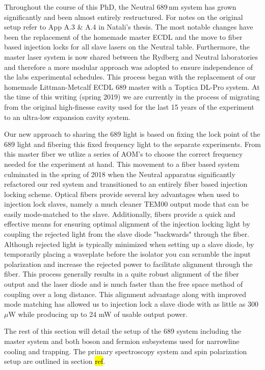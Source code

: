 Throughout the course of this PhD, the Neutral 689\,nm system has grown significantly and been almost entirely restructured. 
For notes on the original setup refer to App A.3 \& A.4 in Natali's thesis.
The most notable changes have been the replacement of the homemade master ECDL and the move to fiber based injection locks for all slave lasers on the Neutral table.
Furthermore, the master laser system is now shared between the Rydberg and Neutral laboratories and therefore a more modular approach was adopted to ensure independence of the labs experimental schedules. 
This process began with the replacement of our homemade Littman-Metcalf ECDL 689 master with a Toptica DL-Pro system. At the time of this writing (spring 2019) we are currently in the process of migrating from the original high-finesse cavity used for the last 15 years \cite{Nagel2004} of the experiment to an ultra-low expansion cavity system. 

Our new approach to sharing the 689 light is based on fixing the lock point of the 689 light and fibering this fixed frequency light to the separate experiments. 
From this master fiber we utlize a series of AOM's to choose the correct frequency needed for the experiment at hand. This movement to a fiber based system culminated in the spring of 2018 when the Neutral apparatus significantly refactored our red system and transitioned to an entirely fiber based injection locking scheme. 
Optical fibers provide several key advantages when used to injection lock slaves, namely a much cleaner TEM00 output mode that can be easily mode-matched to the slave. 
Additionally, fibers provide a quick and effective means for ensuring optimal alignment of the injection locking light by coupling the rejected light from the slave diode "backwards" through the fiber. 
Although rejected light is typically minimized when setting up a slave diode, by temporarily placing a waveplate before the isolator you can scramble the input polarization and increase the rejected power to facilitate alignment through the fiber. 
This process generally results in a quite robust alignment of the fiber output and the laser diode and is much faster than the free space method of coupling over a long distance. 
This alignment advantage along with improved mode matching has allowed us to injection lock a slave diode with as little as 300 $\mu$W while producing up to 24 mW of usable output power.

The rest of this section will detail the setup of the 689 system including the master system and both boson and fermion subsystems used for narrowline cooling and trapping.
The primary spectroscopy system and spin polarization setup are outlined in section \hl{ref}.
	

